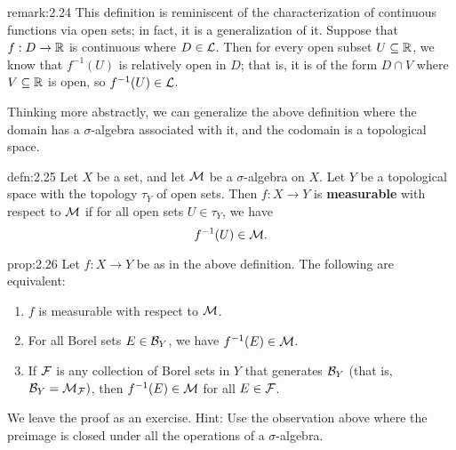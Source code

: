 \begin{remark}{remark:2.24}
    This definition is reminiscent of the characterization of continuous
    functions via open sets; in fact, it is a generalization of it. 
    Suppose that $f : D \to \mathbb{R}$ is continuous where $D \in {\cal L}$. Then for 
    every open subset $U \subseteq \mathbb{R}$, we know that $f^{-1}(U)$ is relatively 
    open in $D$; that is, it is of the form $D \cap V$ where $V \subseteq \mathbb{R}$ 
    is open, so $f^{-1}(U) \in {\cal L}$. 
\end{remark}

Thinking more abstractly, we can generalize the above definition where the 
domain has a $\sigma$-algebra associated with it, and the codomain 
is a topological space. 

\begin{defn}{defn:2.25}
    Let $X$ be a set, and let ${\cal M}$ be a $\sigma$-algebra on $X$. 
    Let $Y$ be a topological space with the topology $\tau_Y$ of open sets. 
    Then $f : X \to Y$ is {\bf measurable} with respect to ${\cal M}$ 
    if for all open sets $U \in \tau_Y$, we have 
    \[ f^{-1}(U) \in {\cal M}. \] 
\end{defn}

\begin{prop}{prop:2.26}
    Let $f : X \to Y$ be as in the above definition. The following are equivalent:
    \begin{enumerate}[(1)]
        \item $f$ is measurable with respect to ${\cal M}$. 
        \item For all Borel sets $E \in {\cal B}_Y$, we have $f^{-1}(E) \in {\cal M}$. 
        \item If ${\cal F}$ is any collection of Borel sets in $Y$ that generates 
        ${\cal B}_Y$ (that is, ${\cal B}_Y = {\cal M}_{\cal F})$, then 
        $f^{-1}(E) \in {\cal M}$ for all $E \in {\cal F}$. 
    \end{enumerate}
\end{prop}
\begin{pf}
    We leave the proof as an exercise. Hint: Use the observation above where 
    the preimage is closed under all the operations of a $\sigma$-algebra. 
\end{pf}

